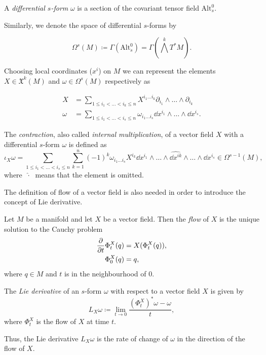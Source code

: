 \begin{definition}
    A \emph{differential $s$-form} $\omega$ is a section of the covariant tensor field $\text{Alt}_s ^0$.
\end{definition}

Similarly, we denote the space of differential $s$-forms by

\begin{equation*}
    \Omega ^s(M) \coloneqq \Gamma (\text{Alt}_s ^0 ) = \Gamma \left( \bigwedge ^k T^*M \right).
\end{equation*}

Choosing local coordinates ($x^i$) on $M$ we can represent the elements $X \in \mathfrak{X}^k(M)$ and $\omega \in \Omega^s(M)$ respectively as

\begin{align*}
    X &= \sum_{1 \leq i_1 < \ldots < i_k \leq n} X^{i_1 \ldots i_k} \partial_{i_1} \wedge \ldots \wedge \partial_{i_k} \\
    \omega &= \sum_{1 \leq i_1 < \ldots < i_s \leq n} \omega_{i_1 \ldots i_s} \dd x^{i_1} \wedge \ldots \wedge \dd x^{i_s}.
\end{align*}

\begin{definition}
    The \emph{contraction}, also called \emph{internal multiplication}, of a vector field $X$ with a differential $s$-form $\omega$ is defined as
    \begin{equation*}
        \iota_X \omega = \sum_{1\leq i_1 < \ldots < i_s \leq n} \sum_{k=1}^n (-1)^k \omega_{i_1 \ldots i_s} X^{i_k} \dd x^{i_1} \wedge \ldots \wedge \widehat{\dd x^{ik}} \wedge \ldots \wedge \dd x^{i_s} \in \Omega^{s-1}(M),
    \end{equation*}
    where $\; \widehat{\cdot} \;$ means that the element is omitted.
\end{definition}

The definition of flow of a vector field is also needed in order to introduce the concept of Lie derivative.

\begin{definition}
    Let $M$ be a manifold and let $X$ be a vector field.
    Then the \emph{flow} of $X$ is the unique solution to the Cauchy problem
    \begin{align*}
        \pderivative{t} \Phi _t ^X (q) &= X(\Phi_t ^X (q)), \\
        \Phi_0 ^X (q) &= q,
    \end{align*}
    where $q \in M$ and $t$ is in the neighbourhood of $0$.
\end{definition}

\begin{definition}
    The \emph{Lie derivative} of an $s$-form $\omega$ with respect to a vector field $X$ is given by
    \begin{equation*}
        L_X \omega \coloneqq \lim _{t \rightarrow 0} \frac{(\Phi_t ^X)^* \omega - \omega}{t},
    \end{equation*}
    where $\Phi_t ^X$ is the flow of $X$ at time $t$.
\end{definition}

Thus, the Lie derivative $L_X \omega$ is the rate of change of $\omega$ in the direction of the flow of $X$.